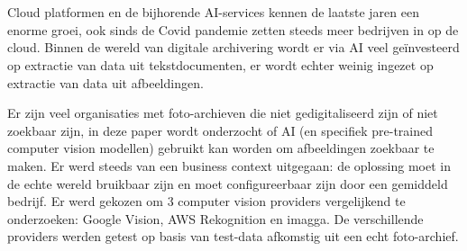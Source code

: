 
%
%

%



\chapter*{}
Cloud platformen en de bijhorende AI-services kennen de laatste jaren een enorme groei, ook sinds de Covid pandemie zetten steeds meer bedrijven in op de cloud. Binnen de wereld van digitale archivering wordt er via AI veel geïnvesteerd op extractie van data uit tekstdocumenten, er wordt echter weinig ingezet op extractie van data uit afbeeldingen.

Er zijn veel organisaties met foto-archieven die niet gedigitaliseerd zijn of niet zoekbaar zijn, in deze paper wordt onderzocht of AI (en specifiek pre-trained computer vision modellen) gebruikt kan worden om afbeeldingen zoekbaar te maken. Er werd steeds van een business context uitgegaan: de oplossing moet in de echte wereld bruikbaar zijn en moet configureerbaar zijn door een gemiddeld bedrijf. Er werd gekozen om 3 computer vision providers vergelijkend te onderzoeken: Google Vision, AWS Rekognition en imagga. De verschillende providers werden getest op basis van test-data afkomstig uit een echt foto-archief.

